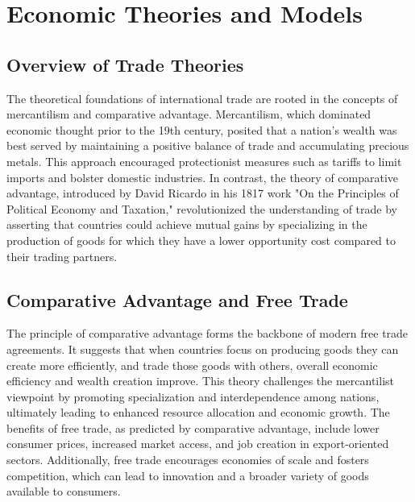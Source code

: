 \documentclass[12pt]{article}
\begin{document}
\section{Economic Theories and Models}

\subsection{Overview of Trade Theories}
The theoretical foundations of international trade are rooted in the concepts of mercantilism and comparative advantage. Mercantilism, which dominated economic thought prior to the 19th century, posited that a nation's wealth was best served by maintaining a positive balance of trade and accumulating precious metals. This approach encouraged protectionist measures such as tariffs to limit imports and bolster domestic industries. In contrast, the theory of comparative advantage, introduced by David Ricardo in his 1817 work "On the Principles of Political Economy and Taxation," revolutionized the understanding of trade by asserting that countries could achieve mutual gains by specializing in the production of goods for which they have a lower opportunity cost compared to their trading partners.

\subsection{Comparative Advantage and Free Trade}
The principle of comparative advantage forms the backbone of modern free trade agreements. It suggests that when countries focus on producing goods they can create more efficiently, and trade those goods with others, overall economic efficiency and wealth creation improve. This theory challenges the mercantilist viewpoint by promoting specialization and interdependence among nations, ultimately leading to enhanced resource allocation and economic growth. The benefits of free trade, as predicted by comparative advantage, include lower consumer prices, increased market access, and job creation in export-oriented sectors. Additionally, free trade encourages economies of scale and fosters competition, which can lead to innovation and a broader variety of goods available to consumers.
\end{document}
